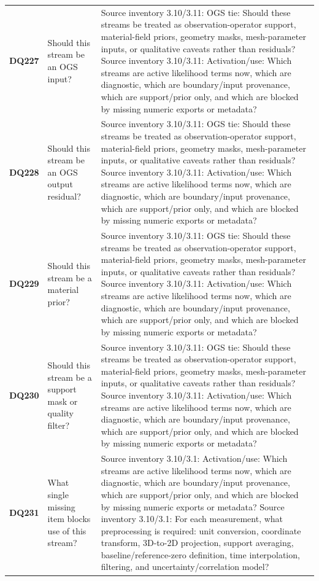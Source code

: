 \begin{longtable}{@{}L{0.09\textwidth} L{0.31\textwidth} L{0.52\textwidth}@{}}
\addlinespace[0.18em]
\textbf{DQ227} & Should this stream be an OGS input? & Source inventory 3.10/3.11: OGS tie: Should these streams be treated as observation-operator support, material-field priors, geometry masks, mesh-parameter inputs, or qualitative caveats rather than residuals? Source inventory 3.10/3.11: Activation/use: Which streams are active likelihood terms now, which are diagnostic, which are boundary/input provenance, which are support/prior only, and which are blocked by missing numeric exports or metadata?\\
\addlinespace[0.18em]
\textbf{DQ228} & Should this stream be an OGS output residual? & Source inventory 3.10/3.11: OGS tie: Should these streams be treated as observation-operator support, material-field priors, geometry masks, mesh-parameter inputs, or qualitative caveats rather than residuals? Source inventory 3.10/3.11: Activation/use: Which streams are active likelihood terms now, which are diagnostic, which are boundary/input provenance, which are support/prior only, and which are blocked by missing numeric exports or metadata?\\
\addlinespace[0.18em]
\textbf{DQ229} & Should this stream be a material prior? & Source inventory 3.10/3.11: OGS tie: Should these streams be treated as observation-operator support, material-field priors, geometry masks, mesh-parameter inputs, or qualitative caveats rather than residuals? Source inventory 3.10/3.11: Activation/use: Which streams are active likelihood terms now, which are diagnostic, which are boundary/input provenance, which are support/prior only, and which are blocked by missing numeric exports or metadata?\\
\addlinespace[0.18em]
\textbf{DQ230} & Should this stream be a support mask or quality filter? & Source inventory 3.10/3.11: OGS tie: Should these streams be treated as observation-operator support, material-field priors, geometry masks, mesh-parameter inputs, or qualitative caveats rather than residuals? Source inventory 3.10/3.11: Activation/use: Which streams are active likelihood terms now, which are diagnostic, which are boundary/input provenance, which are support/prior only, and which are blocked by missing numeric exports or metadata?\\
\addlinespace[0.18em]
\textbf{DQ231} & What single missing item blocks use of this stream? & Source inventory 3.10/3.1: Activation/use: Which streams are active likelihood terms now, which are diagnostic, which are boundary/input provenance, which are support/prior only, and which are blocked by missing numeric exports or metadata? Source inventory 3.10/3.1: For each measurement, what preprocessing is required: unit conversion, coordinate transform, 3D-to-2D projection, support averaging, baseline/reference-zero definition, time interpolation, filtering, and uncertainty/correlation model?\\

\end{longtable}

